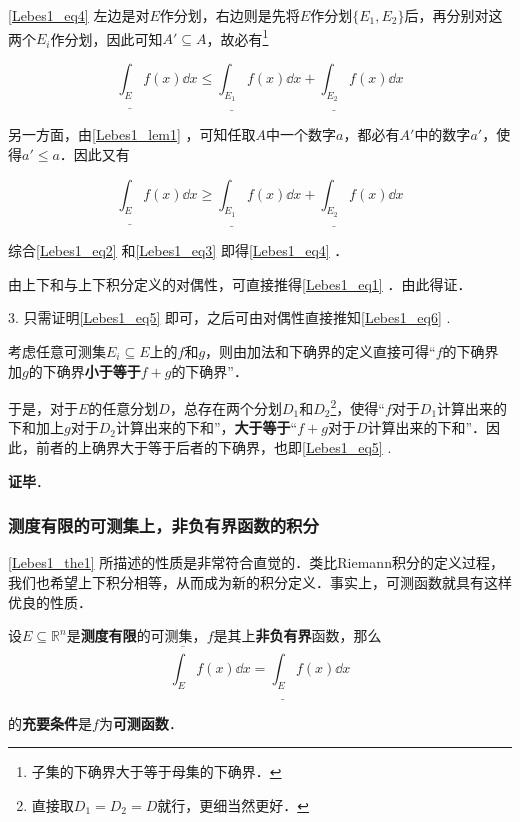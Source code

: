 \autoref{Lebes1_eq4} 左边是对$E$作分划，右边则是先将$E$作分划$\{E_1, E_2\}$后，再分别对这两个$E_i$作分划，因此可知$A'\subseteq A$，故必有\footnote{子集的下确界大于等于母集的下确界．}

 \begin{equation}\label{Lebes1_eq2}
  \underline{\int_E} f(x) \dd x \leq \underline{\int_{E_1}} f(x) \dd x+\underline{\int_{E_2}} f(x) \dd x
  \end{equation}

另一方面，由\autoref{Lebes1_lem1} ，可知任取$A$中一个数字$a$，都必有$A'$中的数字$a'$，使得$a'\leq a$．因此又有

\begin{equation}\label{Lebes1_eq3}
\underline{\int_E} f(x) \dd x \geq \underline{\int_{E_1}} f(x) \dd x+\underline{\int_{E_2}} f(x) \dd x
\end{equation}

综合\autoref{Lebes1_eq2} 和\autoref{Lebes1_eq3} 即得\autoref{Lebes1_eq4} ．

由上下和与上下积分定义的对偶性，可直接推得\autoref{Lebes1_eq1} ．由此得证．

3. 只需证明\autoref{Lebes1_eq5} 即可，之后可由对偶性直接推知\autoref{Lebes1_eq6} .

考虑任意可测集$E_i\subseteq E$上的$f$和$g$，则由加法和下确界的定义直接可得“$f$的下确界加$g$的下确界\textbf{小于等于}$f+g$的下确界”．

于是，对于$E$的任意分划$D$，总存在两个分划$D_1$和$D_2$\footnote{直接取$D_1=D_2=D$就行，更细当然更好．}，使得“$f$对于$D_1$计算出来的下和加上$g$对于$D_2$计算出来的下和”，\textbf{大于等于}“$f+g$对于$D$计算出来的下和”．因此，前者的上确界大于等于后者的下确界，也即\autoref{Lebes1_eq5} .

\textbf{证毕}．







\subsubsection{测度有限的可测集上，非负有界函数的积分}


\autoref{Lebes1_the1} 所描述的性质是非常符合直觉的．类比Riemann积分的定义过程，我们也希望上下积分相等，从而成为新的积分定义．事实上，可测函数就具有这样优良的性质．

\begin{theorem}{}\label{Lebes1_the2}
设$E\subseteq \mathbb{R}^n$是\textbf{测度有限}的可测集，$f$是其上\textbf{非负有界}函数，那么
\begin{equation}\label{Lebes1_eq7}
\overline{\int_E} f(x) \dd x = \underline{\int_E} f(x) \dd x
\end{equation}
\end{theorem}
的\textbf{充要条件}是$f$为\textbf{可测函数}．


